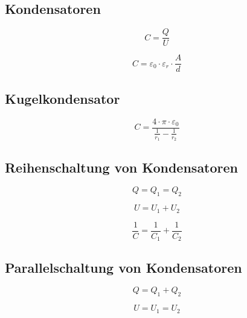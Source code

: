 \subsection{Kondensatoren}
\begin{equation}\label{eq:kondensator:kapazitaet}
C = \frac{Q}{U}
\end{equation}

\begin{equation}\label{eq:kondensator:kapazitaet:platten}
C = \varepsilon_0 \cdot \varepsilon_r \cdot \frac{A}{d}
\end{equation}

\subsection{Kugelkondensator}
\begin{equation}\label{eq:kondensator:kapazitaet:kugel}
C = \frac{4\cdot\pi\cdot\varepsilon_0}{\frac{1}{r_1}-\frac{1}{r_2}}
\end{equation}

\subsection{Reihenschaltung von Kondensatoren}
\begin{equation}\label{eq:kondensator:reihenschaltung:ladung}
Q = Q_1 = Q_2
\end{equation}
 
\begin{equation}\label{eq:kondensator:reihenschaltung:spannung}
U = U_1 + U_2 
\end{equation}
 
\begin{equation}\label{eq:kondensator:reihenschaltung:kapazitaet}
\frac{1}{C} = \frac{1}{C_1} + \frac{1}{C_2}
\end{equation}

\subsection{Parallelschaltung von Kondensatoren}
\begin{equation}\label{eq:kondensator:parallelschaltung:ladung}
Q = Q_1 + Q_2
\end{equation}

\begin{equation}\label{eq:kondensator:parallelschaltung:spannung}
U = U_1 = U_2
\end{equation}

